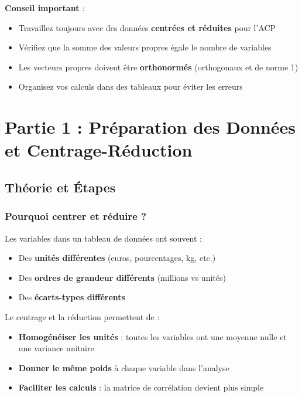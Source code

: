 \documentclass[11pt,a4paper]{article}
\begin{document}
\begin{conseilbox}
\textbf{Conseil important} : 
\begin{itemize}
    \item Travaillez toujours avec des données \textbf{centrées et réduites} pour l'ACP
    \item Vérifiez que la somme des valeurs propres égale le nombre de variables
    \item Les vecteurs propres doivent être \textbf{orthonormés} (orthogonaux et de norme 1)
    \item Organisez vos calculs dans des tableaux pour éviter les erreurs
\end{itemize}
\end{conseilbox}

\newpage

\section{Partie 1 : Préparation des Données et Centrage-Réduction}

\subsection{Théorie et Étapes}

\subsubsection{Pourquoi centrer et réduire ?}

Les variables dans un tableau de données ont souvent :
\begin{itemize}
    \item Des \textbf{unités différentes} (euros, pourcentages, kg, etc.)
    \item Des \textbf{ordres de grandeur différents} (millions vs unités)
    \item Des \textbf{écarts-types différents}
\end{itemize}

Le centrage et la réduction permettent de :
\begin{itemize}
    \item \textbf{Homogénéiser les unités} : toutes les variables ont une moyenne nulle et une variance unitaire
    \item \textbf{Donner le même poids} à chaque variable dans l'analyse
    \item \textbf{Faciliter les calculs} : la matrice de corrélation devient plus simple
\end{itemize}
\end{document}
